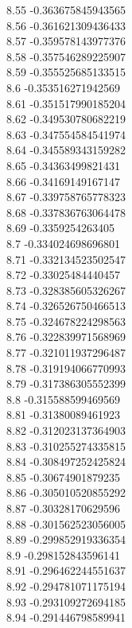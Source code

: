 {8.55	-0.363675845943565\\
8.56	-0.361621309436433\\
8.57	-0.359578143977376\\
8.58	-0.357546289225907\\
8.59	-0.355525685133515\\
8.6	-0.353516271942569\\
8.61	-0.351517990185204\\
8.62	-0.349530780682219\\
8.63	-0.347554584541974\\
8.64	-0.345589343159282\\
8.65	-0.34363499821431\\
8.66	-0.34169149167147\\
8.67	-0.339758765778323\\
8.68	-0.337836763064478\\
8.69	-0.3359254263405\\
8.7	-0.334024698696801\\
8.71	-0.332134523502547\\
8.72	-0.33025484440457\\
8.73	-0.328385605326267\\
8.74	-0.326526750466513\\
8.75	-0.324678224298563\\
8.76	-0.322839971568969\\
8.77	-0.321011937296487\\
8.78	-0.319194066770993\\
8.79	-0.317386305552399\\
8.8	-0.315588599469569\\
8.81	-0.31380089461923\\
8.82	-0.312023137364903\\
8.83	-0.310255274335815\\
8.84	-0.308497252425824\\
8.85	-0.30674901879235\\
8.86	-0.305010520855292\\
8.87	-0.30328170629596\\
8.88	-0.301562523056005\\
8.89	-0.299852919336354\\
8.9	-0.298152843596141\\
8.91	-0.296462244551637\\
8.92	-0.294781071175194\\
8.93	-0.293109272694185\\
8.94	-0.291446798589941\\
}

